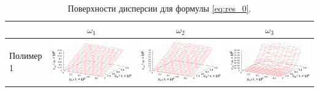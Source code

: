 \documentclass[11pt,a4paper]{article}
\theoremstyle{definition}
\begin{document}
\begin{table}[h]
  \centering
  \footnotesize
  \caption{Поверхности дисперсии для формулы \eqref{eq:res_0}.}
  \begin{tabular}{l | c c c}
	  & $\omega_1$ & $\omega_2$ & $\omega_3$ \\ \hline
	\begin{rotate}{90}Полимер 1\end{rotate} &	\includegraphics[scale=0.4]{figs/even/p1.txt_coeff0.dat.eps} & \includegraphics[scale=0.4]{figs/even/p1.txt_coeff1.dat.eps} & \includegraphics[scale=0.4]{figs/even/p1.txt_coeff2.dat.eps} \\

\end{tabular}
\end{table}
\end{document}
